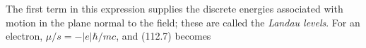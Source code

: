 The first term in this expression supplies the discrete energies associated with motion in the plane normal to the field; these are called the \emph{Landau levels}. For an electron, $\mu/s=-|e|\hbar/mc$, and (112.7) becomes

